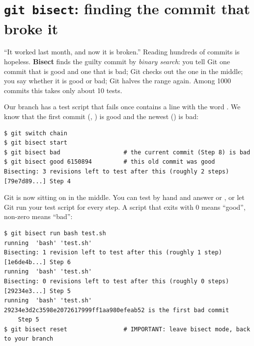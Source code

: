 \section{\texttt{git bisect}: finding the commit that broke it}

``It worked last month, and now it is broken.'' Reading hundreds of commits is hopeless. \textbf{Bisect} finds the guilty commit by \emph{binary search}: you tell Git one commit that is good and one that is bad; Git checks out the one in the middle; you say whether it is good or bad; Git halves the range again. Among 1000 commits this takes only about 10 tests.

Our  branch has a test script  that fails once  contains a line with the word . 
We know that the first commit (, ) is good and the newest () is bad:

\begin{lstlisting}
$ git switch chain
$ git bisect start
$ git bisect bad                  # the current commit (Step 8) is bad
$ git bisect good 6150894         # this old commit was good
Bisecting: 3 revisions left to test after this (roughly 2 steps)
[79e7d89...] Step 4
\end{lstlisting}

Git is now sitting on  in the middle. You can test by hand and answer  or , or let Git run your test script for every step. A script that exits with 0 means ``good'', non-zero means ``bad'':

\begin{lstlisting}
$ git bisect run bash test.sh
running  'bash' 'test.sh'
Bisecting: 1 revision left to test after this (roughly 1 step)
[1e6de4b...] Step 6
running  'bash' 'test.sh'
Bisecting: 0 revisions left to test after this (roughly 0 steps)
[29234e3...] Step 5
running  'bash' 'test.sh'
29234e3d2c3598e2072617999ff1aa980efeab52 is the first bad commit
    Step 5
$ git bisect reset                # IMPORTANT: leave bisect mode, back to your branch
\end{lstlisting}

